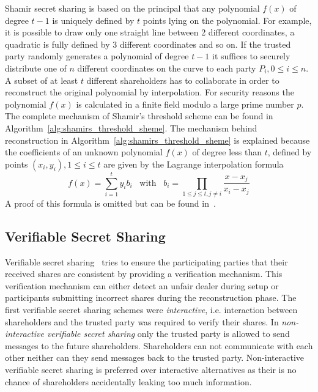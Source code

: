 Shamir secret sharing is based on the principal that any polynomial $f \left( x \right)$ of degree $t-1$ is uniquely defined by $t$ points lying on the polynomial. For example, it is possible to draw only one straight line between 2 different coordinates, a quadratic is fully defined by 3 different coordinates and so on. If the trusted party randomly generates a polynomial of degree $t-1$ it suffices to securely distribute one of $n$ different coordinates on the curve to each party $P_i, 0 \leq i \leq n$. A subset of at least $t$ different shareholders has to collaborate in order to reconstruct the original polynomial by interpolation. For security reasons the polynomial $f \left( x \right)$ is calculated in a finite field modulo a large prime number $p$. The complete mechanism of Shamir's threshold scheme can be found in Algorithm~\ref{alg:shamirs_threshold_sheme}. The mechanism behind reconstruction in Algorithm~\ref{alg:shamirs_threshold_sheme} is explained because the coefficients of an unknown polynomial $f \left( x \right)$ of degree less than $t$, defined by points $\left( x_i, y_i \right), 1 \leq i \leq t$ are given by the Lagrange interpolation formula
\begin{equation*}
 f \left( x \right) = \sum^t_{i=1}y_i b_i \; \; \; \textrm{with} \; \; \; b_i = \prod_{1 \leq j \leq t, j \neq i} \frac{x-x_j}{x_i-x_j}
\end{equation*}
A proof of this formula is omitted but can be found in~\cite{site:proofwiki_lagrange}.

\subsection{Verifiable Secret Sharing}
Verifiable secret sharing~\cite{art:ChorGMA85} tries to ensure the participating parties that their received shares are consistent by providing a verification mechanism. This verification mechanism can either detect an unfair dealer during setup or participants submitting incorrect shares during the reconstruction phase. The first verifiable secret sharing schemes were \textit{interactive}, i.e. interaction between shareholders and the trusted party was required to verify their shares. In \textit{non-interactive verifiable secret sharing} only the trusted party is allowed to send messages to the future shareholders. Shareholders can not communicate with each other neither can they send messages back to the trusted party. Non-interactive verifiable secret sharing is preferred over interactive alternatives as their is no chance of shareholders accidentally leaking too much information.

